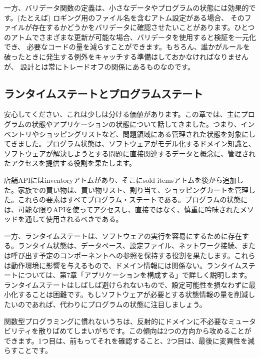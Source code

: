 一方、バリデータ関数の定義は、小さなデータやプログラムの状態には効果的です。(たとえば) ロギング用のファイル名を含むアトム設定がある場合、 そのファイルが存在するかどうかをバリデータに確認させたいことがあります。ひとつのアトムでさまざまな更新が可能な場合、バリデータを使用すると検証を一元化でき、 必要なコードの量を減らすことができます。もちろん、誰かがルールを破ったときに発生する例外をキャッチする準備はしておかなければなりませんが、 設計とは常にトレードオフの関係にあるものなのです。

\subsection{ランタイムステートとプログラムステート}

安心してください、これは少しは分ける価値があります。この章では、主にプログラムの状態やアプリケーションの状態について話してきました。つまり、インベントリやショッピングリストなど、問題領域にある管理された状態を対象にしてきました。プログラム状態は、ソフトウェアがモデル化するドメイン知識と、ソフトウェアが解決しようとする問題に直接関連するデータと概念に、管理されたアクセスを提供する役割を果たします。

店舗APIにはinventoryアトムがあり、そこにsold-itemsアトムを後から追加した。家族での買い物は、買い物リスト、割り当て、ショッピングカートを管理した。これらの要素はすべてプログラム・ステートである。プログラムの状態には、可能な限りAPIを使ってアクセスし、直接ではなく、慎重に吟味されたメソッドを通して使用されるべきである。

一方、ランタイムステートは、ソフトウェアの実行を容易にするために存在する。ランタイム状態は、データベース、設定ファイル、ネットワーク接続、または呼び出す予定のコンポーネントへの参照を保持する役割を果たします。これらは動作環境に影響を与えるもので、ドメイン情報には関係ない。ランタイムステートについては、第7章「アプリケーションを構成する」で詳しく説明します。ランタイムステートはしばしば避けられないもので、設定可能性を損なわずに最小化することは困難です。もしソフトウェアが必要とする状態情報の量を削減したいのであれば、代わりにプログラムの状態に注目しましょう。

関数型プログラミングに慣れないうちは、反射的にドメインに不必要なミュータビリティを散りばめてしまいがちです。この傾向は2つの方向から攻めることができます。1つ目は、前もってそれを確認すること、2つ目は、最後に変異性を減らすことです。



